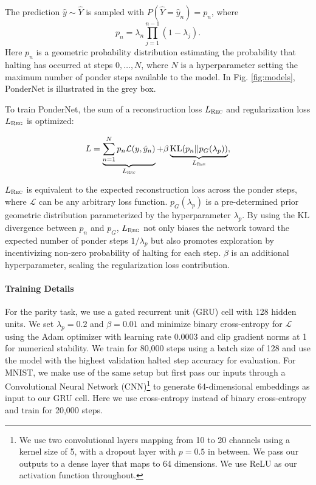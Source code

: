 \documentclass{article}
\begin{document}
The prediction $\hat y \sim \hat Y$ is sampled with $P(\hat Y = \hat y_n) = p_n$, where 
\begin{equation}
    p_n = \lambda_n \prod_{j=1}^{n-1}(1-\lambda_j).
\end{equation}
Here $p_n$ is a geometric probability distribution estimating the probability that halting has occurred at steps $0, \dots, N$, where $N$ is a hyperparameter setting the maximum number of ponder steps available to the model. In Fig. \ref{fig:models}, PonderNet is illustrated in the grey box.

To train PonderNet, the sum of a reconstruction loss $L_{\textsc{Rec}}$ and regularization loss $L_{\textsc{Reg}}$ is optimized:

\begin{equation}\label{eq:ponderloss}
    L = \underbrace{\sum_{n=1}^N p_n \mathcal{L}(y, \hat y_n)}_\text{$L_{\textsc{Rec}}$} + \beta \underbrace{ \text{KL}(p_n || p_G(\lambda_p))}_\text{$L_{\textsc{Reg}}$},
\end{equation}


$L_{\textsc{Rec}}$ is equivalent to the expected reconstruction loss across the ponder steps, where $\mathcal{L}$ can be any arbitrary loss function.  $p_G(\lambda_p)$ is a pre-determined prior geometric distribution parameterized by the hyperparameter $\lambda_p$. By using the $\text{KL}$ divergence \cite{kullback_information_1951} between $p_n$ and $p_G$, $L_{\textsc{Reg}}$ not only biases the network toward the expected number of ponder steps $1/\lambda_p$ but also promotes exploration by incentivizing non-zero probability of halting for each step. $\beta$ is an additional hyperparameter, scaling the regularization loss contribution. 

\paragraph{Training Details} For the parity task, we use a gated recurrent unit (GRU) cell \citep{chung_empirical_2014} with 128 hidden units. We set $\lambda_p = 0.2$ and $\beta=0.01$ and minimize binary cross-entropy for $\mathcal{L}$ using the Adam optimizer \citep{kingma_adam_2017-1} with learning rate 0.0003 and clip gradient norms at 1 for numerical stability. We train for 80,000 steps using a batch size of 128 and use the model with the highest validation halted step accuracy for evaluation. For MNIST, we make use of the same setup but first pass our inputs through a Convolutional Neural Network (CNN)\footnote{We use two convolutional layers mapping from 10 to 20 channels using a kernel size of 5, with a dropout layer \citep{srivastava_dropout_2014} with $p=0.5$ in between. We pass our outputs to a dense layer that maps to 64 dimensions. We use ReLU as our activation function throughout.} to generate 64-dimensional embeddings as input to our GRU cell. Here we use cross-entropy instead of binary cross-entropy and train for 20,000 steps.
\end{document}
